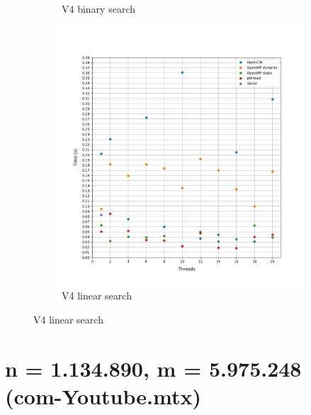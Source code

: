 \documentclass[12pt, a4paper]{article}
\begin{document}
\begin{figure}[h!]
\begin{subfigure}[b]{0.33\textwidth}
         \caption{V4 binary search}
     \end{subfigure}
     \begin{subfigure}[b]{0.33\textwidth}
         \centering
         \includegraphics[height=.4\textheight, width=\textwidth, keepaspectratio]{assets/belgium/v4_linear.png}
         \caption{V4 linear search} 
     \end{subfigure}
\end{figure}

\section{n = 1.134.890, m = 5.975.248 (com-Youtube.mtx)}
\end{document}
